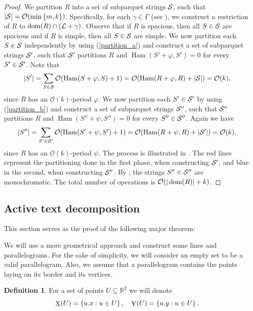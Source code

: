 \documentclass[11pt]{article}
\newcommand{\R}{\mathbb{R}}
\renewcommand{\O}{\mathcal{O}}
\renewcommand{\phi}{\varphi}
\newcommand{\set}[1]{\left\lbrace #1 \right\rbrace}
\theoremstyle{plain}
\theoremstyle{definition}
\newtheorem{definition}{Definition}
\theoremstyle{remark}
\DeclareMathOperator*{\X}{X}
\DeclareMathOperator*{\Y}{Y}
\DeclareMathOperator*{\Ham}{Ham}
\begin{document}
\ParquetDecomposition
\begin{proof}
	We partition $R$ into a set of subparquet strings $\S$, such that $|\S| = \O(\min\set{m, k})$.
	Specifically, for each $\gamma \in \Gamma$ (see ), we construct a restriction of $R$ to $\d{R} \cap (\L + \gamma)$.
	Observe that if $R$ is spacious, then all $S \in \S$ are spacious and if $R$ is simple, then all $S \in \S$ are simple.
	We now partition each $S \in \S$ independently by using  (\ref{partition_a})
	and construct a set of subparquet strings $\S'$, such that $\S'$ partitions $R$ and $\Ham(S' + \phi, S') = 0$ for every $S' \in \S'$.
	Note that
	\[ |S'| = \sum_{S \in \S} \O(\Ham(S + \phi, S) + 1) = \O(\Ham(R + \phi, R) + |\S|) = \O(k),\]
	since $R$ has an $\O(k)$-period $\phi$.
	We now partition each $S' \in \S'$ by using  (\ref{partition_b}) and construct a set of subparquet strings $\S''$, such that $\S''$ partitions $R$ and $\Ham(S'' + \psi, S'') = 0$ for every $S'' \in \S''$.
	Again we have
	\[ |S''| = \sum_{S' \in \S'} \O(\Ham(S' + \psi, S') + 1) = \O(\Ham(R + \psi, R) + |\S'|) = \O(k),\]
	since $R$ has an $\O(k)$-period $\psi$.
	The process is illustrated in .
	The red lines represent the partitioning done in the first phase, when constructing $\S'$, and blue in the second, when constructing $\S''$.
	By , the strings $S'' \in \S''$ are monochromatic.
	The total number of operations is $\O(|\d{R}| + k)$.
\end{proof}

\subsection{Active text decomposition} \label{text_decomposition_proof}

This section serves as the proof of the following major theorem:

\TextDecomposition

We will use a more geometrical approach and construct some lines and parallelograms.
For the sake of simplicity, we will consider an empty set to be a valid parallelogram.
Also, we assume that a parallelogram contains the points laying on its border and its vertices.

\begin{definition}
	For a set of points $U \subseteq \R^2$ we will denote
	\[ \X(U) = \set{\x{u} : u \in U}, \quad \Y(U) = \set{\y{u} : u \in U}.\]
\end{definition}
\end{document}
